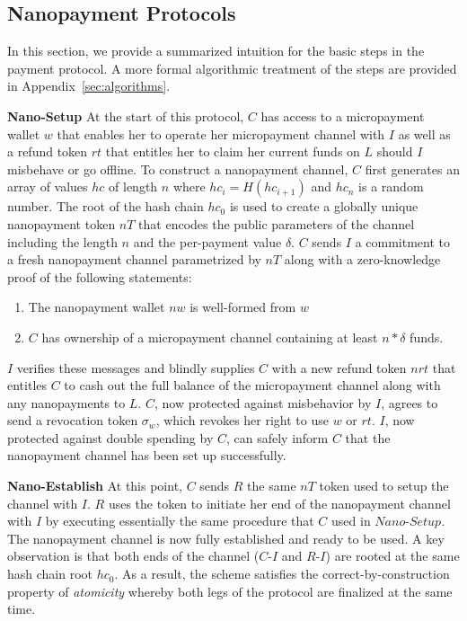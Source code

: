 \subsection{Nanopayment Protocols}
In this section, we provide a summarized intuition for the basic steps in the
payment protocol. A more formal algorithmic treatment of the steps are provided
in Appendix~\ref{sec:algorithms}.

\textbf{Nano-Setup} At the start of this protocol, $C$ has access to a
micropayment wallet $w$ that enables her to operate her micropayment channel
with $I$ as well as a refund token $rt$ that entitles her to claim her current
funds on $L$ should $I$ misbehave or go offline. To construct a nanopayment
channel, $C$ first generates an array of values $hc$ of length $n$ where
$hc_i = H(hc_{i+1})$ and $hc_n$ is a random number. The root of the hash chain
$hc_0$ is used to create a globally unique nanopayment token $nT$ that encodes
the public parameters of the channel including the length $n$ and the
per-payment value $\delta$. $C$ sends $I$ a commitment to a fresh nanopayment
channel parametrized by $nT$ along with a zero-knowledge proof of the following
statements:

\begin{enumerate}
\item The nanopayment wallet $nw$ is well-formed from $w$
\item $C$ has ownership of a micropayment channel containing at least $n *
  \delta$ funds.
\end{enumerate}

$I$ verifies these messages and blindly supplies $C$ with a new refund token
$nrt$ that entitles $C$ to cash out the full balance of the micropayment channel
along with any nanopayments to $L$. $C$, now protected against misbehavior by
$I$, agrees to send a revocation token $\sigma_w$, which revokes her right to
use $w$ or $rt$. $I$, now protected against double spending by $C$, can safely
inform $C$ that the nanopayment channel has been set up successfully.

\textbf{Nano-Establish} At this point, $C$ sends $R$ the same $nT$ token used to
setup the channel with $I$. $R$ uses the token to initiate her end of the
nanopayment channel with $I$ by executing essentially the same procedure that
$C$ used in $Nano$-$Setup$. The nanopayment channel is now fully established and
ready to be used. A key observation is that both ends of the channel ($C$-$I$
and $R$-$I$) are rooted at the same hash chain root $hc_0$. As a result, the
scheme satisfies the correct-by-construction property of \emph{atomicity}
whereby both legs of the protocol are finalized at the same time.

